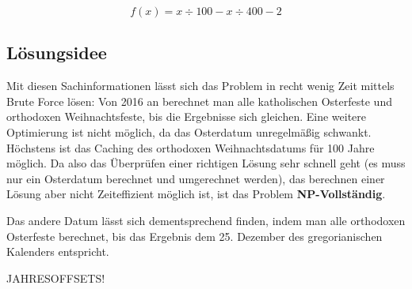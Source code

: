 	\[f(x)=x\div{}100-x\div{}400-2\]

\clearpage
\subsection {Lösungsidee}
	Mit diesen Sachinformationen lässt sich das Problem in recht wenig Zeit mittels Brute Force lösen: Von 2016 an berechnet man alle katholischen Osterfeste und orthodoxen Weihnachtsfeste, bis die Ergebnisse sich gleichen. Eine weitere Optimierung ist nicht möglich, da das Osterdatum unregelmäßig schwankt. Höchstens ist das Caching des orthodoxen Weihnachtsdatums für 100 Jahre möglich. Da also das Überprüfen einer richtigen Lösung sehr schnell geht (es muss nur ein Osterdatum berechnet und umgerechnet werden), das berechnen einer Lösung aber nicht Zeiteffizient möglich ist, ist das Problem \textbf{NP-Vollständig}.

	Das andere Datum lässt sich dementsprechend finden, indem man alle orthodoxen Osterfeste berechnet, bis das Ergebnis dem 25. Dezember des gregorianischen Kalenders entspricht.

	JAHRESOFFSETS!